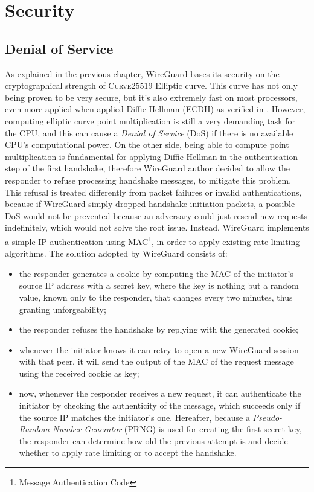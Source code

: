 \documentclass[light]{academica}
\begin{document}
\chapter{Security}\label{chap:security}

\section{Denial of Service}\label{sec:dos}

As explained in the previous chapter, WireGuard bases its security on the cryptographical strength of \textsc{Curve25519} Elliptic curve.
This curve has not only being proven to be very secure, but it's also extremely fast on most processors, even more applied when applied Diffie-Hellman (ECDH) as verified in \cite{curve25519}.
However, computing elliptic curve point multiplication is still a very demanding task for the CPU, and this can cause a \textit{Denial of Service} (DoS) if there is no available CPU's computational power.
On the other side, being able to compute point multiplication is fundamental for applying Diffie-Hellman in the authentication step of the first handshake, therefore WireGuard author decided to allow the responder to refuse processing handshake messages, to mitigate this problem.
This refusal is treated differently from packet failures or invalid authentications, because if WireGuard simply dropped handshake initiation packets, a possible DoS would not be prevented because an adversary could just resend new requests indefinitely, which would not solve the root issue.
Instead, WireGuard implements a simple IP authentication using MAC\footnote{Message Authentication Code}, in order to apply existing rate limiting algorithms.
The solution adopted by WireGuard consists of:
\begin{itemize}
  \item the responder generates a cookie by computing the MAC of the initiator’s source IP address with a secret key, where the key is nothing but a random value, known only to the responder, that changes every two minutes, thus granting unforgeability;
  \item the responder refuses the handshake by replying with the generated cookie;
  \item whenever the initiator knows it can retry to open a new WireGuard session with that peer, it will send the output of the MAC of the request message using the received cookie as key;
  \item now, whenever the responder receives a new request, it can authenticate the initiator by checking the authenticity of the message, which succeeds only if the source IP matches the initiator's one. Hereafter, because a \textit{Pseudo-Random Number Generator} (PRNG) is used for creating the first secret key, the responder can determine how old the previous attempt is and decide whether to apply rate limiting or to accept the handshake.
\end{itemize}
\end{document}
